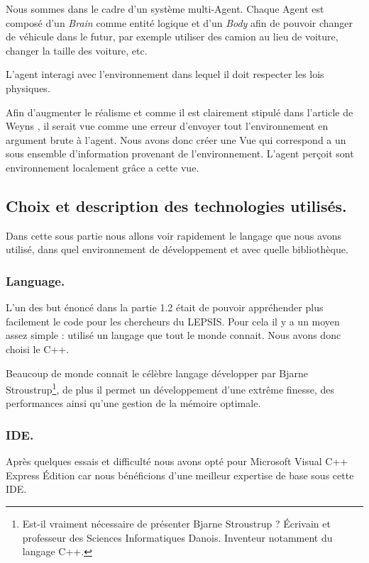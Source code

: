 \documentclass[a4paper,11pt]{article}
\begin{document}
Nous sommes dans le cadre d'un système multi-Agent. Chaque Agent est composé d'un \textit{Brain} comme entité logique et d'un \textit{Body} afin de pouvoir changer de véhicule dans le futur, par exemple utiliser des camion au lieu de voiture, changer la taille des voiture, etc.

L'agent interagi avec l'environnement dans lequel il doit respecter les lois physiques. 

Afin d'augmenter le réalisme et comme il est clairement stipulé dans l'article de Weyns \cite{Weyns05environmentfor}, il serait vue comme une erreur d'envoyer tout l'environnement en argument brute à l'agent. Nous avons donc créer une Vue qui correspond a un sous ensemble d'information provenant de l'environnement. L'agent perçoit sont environnement localement grâce a cette vue. 

\subsection{Choix et description des technologies utilisés.}

Dans cette sous partie nous allons voir rapidement le langage que nous avons utilisé, dans quel environnement de développement et avec quelle bibliothèque.

\subsubsection{Language.}

L'un des but énoncé dans la partie 1.2 était de pouvoir appréhender plus facilement le code pour les chercheurs du LEPSIS. Pour cela il y a un moyen assez simple : utilisé un langage que tout le monde connait. Nous avons donc choisi le C++. 

Beaucoup de monde connait le célèbre langage développer par Bjarne Stroustrup\footnote{Est-il vraiment nécessaire de présenter Bjarne Stroustrup ? Écrivain et professeur des Sciences Informatiques Danois. Inventeur notamment du langage C++.}, de plus il permet un développement d'une extrême finesse, des performances ainsi qu'une gestion de la mémoire optimale.

\subsubsection{IDE.}

Après quelques essais et difficulté nous avons opté pour Microsoft Visual C++ Express Édition car nous bénéficions d'une meilleur expertise de base sous cette IDE.
\end{document}
